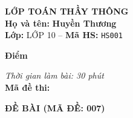 \noindent
\begin{tcolorbox}[colback=white,colframe=black,arc=0mm,boxrule=0.8pt,top=4pt,bottom=4pt,left=6pt,right=6pt]
	\begin{minipage}[c]{0.44\textwidth}
		{\bfseries\large LỚP TOÁN THẦY THÔNG}\\[3pt]
		\textbf{Họ và tên:} \textbf{\large Huyền Thương}\\[3pt]
		\textbf{Lớp:} LỚP 10 \quad -- \quad \textbf{Mã HS:} \texttt{HS001}
	\end{minipage}
	\hfill
	\begin{minipage}[c]{0.22\textwidth}
		\begin{tcolorbox}[colback=white,colframe=black,arc=0mm,boxrule=0.6pt,height=1.8cm,halign=center,valign=top,top=2pt]
			{\bfseries\normalsize Điểm}
		\end{tcolorbox}
	\end{minipage}
	\hfill
	\begin{minipage}[c]{0.30\textwidth}
		\raggedleft
		\textit{Thời gian làm bài: 30 phút}\\[4pt]
		\textbf{Mã đề thi:} 
	\end{minipage}
\end{tcolorbox}
\vspace{0.25cm}

\noindent\textbf{\large ĐỀ BÀI (MÃ ĐỀ: 007)}
\vspace{0.1cm}

